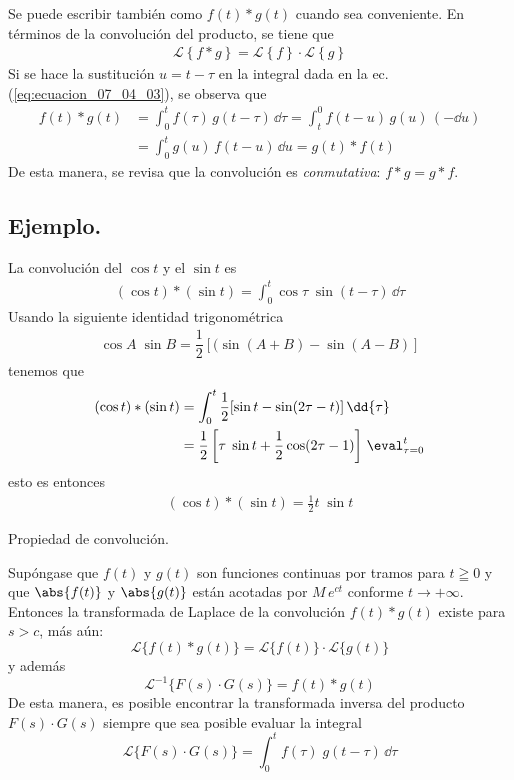 Se puede escribir también como $f(t) * g(t)$ cuando sea conveniente. En términos de la convolución del producto, se tiene que
\begin{align*}
\mathscr{L} \left\{ f * g \right\} = \mathscr{L} \left\{ f \right\} \cdot \mathscr{L} \left\{ g \right\}
\end{align*}
Si se hace la sustitución $u = t - \tau$ en la integral dada en la ec. (\ref{eq:ecuacion_07_04_03}), se observa que
\begin{align*}
f(t) * g(t) &= \int_{0}^{t} f(\tau) \, g(t - \tau) \, \dd{\tau} = \int_{t}^{0} f(t - u) \, g(u) \, (-\dd{u}) \\
&= \int_{0}^{t} g(u) \, f(t - u) \, \dd{u} = g(t) * f(t)
\end{align*}
De esta manera, se revisa que la convolución es \textit{conmutativa}: $f * g = g * f$.
\subsection*{Ejemplo.}
La convolución del $\cos t$ y el $\sin t$ es
\begin{align*}
(\cos t) * (\sin t) = \int_{0}^{t} \cos \tau	\; \sin (t - \tau) \, \dd{\tau}
\end{align*}
Usando la siguiente identidad trigonométrica
\begin{align*}
\cos A \; \sin B =  \dfrac{1}{2} [ (\sin(A + B) - \sin (A - B) ]
\end{align*}
tenemos que
\begin{align*}
(\cos t) * (\sin t) &=  \int_{0}^{t} \frac{1}{2} [\sin t - \sin (2 \tau - t)] \, \dd{\tau} \\
&= \dfrac{1}{2} \left[ \tau \; \sin t + \dfrac{1}{2} \cos (2 \tau - 1) \right] \, \eval_{\tau = 0}^{t}
\end{align*}
esto es entonces
\begin{align*}
(\cos t) * (\sin t) = \frac{1}{2} t \; \sin t
\end{align*}
\begin{teo}{Propiedad de convolución.}

Supóngase que $f(t)$ y $g(t)$ son funciones continuas por tramos para $ t \geqq 0$ y que $\abs{f(t)}$ y $\abs{g(t)}$ están acotadas por $M \, e^{ct}$ conforme $t \to +\infty$. Entonces la transformada de Laplace de la convolución $f(t) * g(t)$ existe para $s > c$, más aún:
\begin{equation}
\mathscr{L} \{ f(t) * g(t) \} = \mathscr{L} \{ f(t) \} \cdot \mathscr{L} \{ g(t) \}
\label{eq:ecuacion_07_04_04}
\end{equation}
y además
\begin{equation}
\mathscr{L}^{-1} \{ F(s) \cdot G(s) \} = f(t) * g(t)
\label{eq:ecuacion_07_04_05}
\end{equation}
De esta manera, es posible encontrar la transformada inversa del producto $F(s) \cdot G(s)$ siempre que sea posible evaluar la integral
\begin{equation}
\mathscr{L} \{ F(s) \cdot G(s) \} = \int_{0}^{t} f(\tau) \; g(t - \tau) \, \dd{\tau}
\label{eq:ecuacion_07_04_05b}
\end{equation}
\end{teo}
